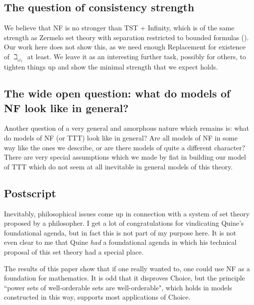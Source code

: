 \documentclass{article}
\theoremstyle{definition}
\theoremstyle{remark}
\begin{document}
{\subsection{The question of consistency strength}


We believe that NF is no stronger than TST + Infinity, which is of the same strength as Zermelo set theory with separation restricted to bounded formulas (\cite{kemeny}).  Our work here does not show this, as we need enough Replacement for
existence of $\beth_{\omega_1}$ at least.  We leave it as an interesting further task, possibly for others, to tighten things up and show the minimal strength that we expect holds.

\subsection{The wide open question:  what do models of NF look like in general?}

Another question of a very general and amorphous nature which remains is:  what do models of NF (or TTT) look like in general?  Are all models of NF in some way like the ones we describe, or are there models of quite a different character?  There are very special assumptions which we made by fiat in building our model of TTT which do  not seem at all inevitable in general models of this theory.

\subsection{Postscript}

Inevitably, philosophical issues come up in connection with a system of set theory proposed by a philosopher.  I get a lot of congratulations for vindicating Quine's foundational agenda, but in fact this is not part of my purpose here.  It is not even clear to me that Quine {\em had\/} a foundational agenda in which his technical proposal of this set theory had a special place.

The results of this paper show that if one really wanted to, one could use NF as a foundation for mathematics.  It is odd that it disproves Choice, but the principle ``power sets of well-orderable sets are well-orderable", which holds in models constructed in this way, supports most applications of Choice.

}
\end{document}
